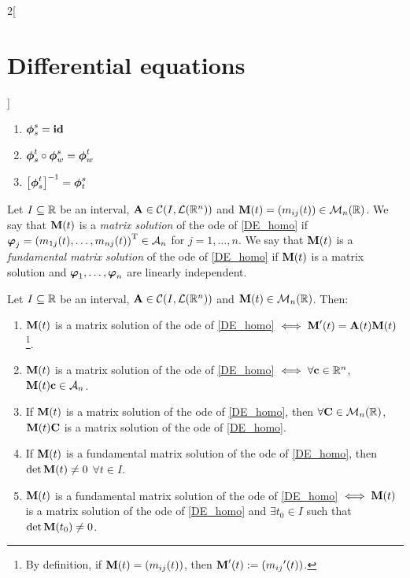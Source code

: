 \documentclass[../../../main.tex]{subfiles}
\begin{document}
\begin{multicols}{2}[\section{Differential equations}]
\begin{corollary}
    \begin{enumerate}
      \item $\boldsymbol{\mathrm{\phi}}_s^s=\boldsymbol{\mathrm{\mathrm{id}}}$
      \item $\boldsymbol{\mathrm{\phi}}_s^t\circ\boldsymbol{\mathrm{\phi}}_w^s=\boldsymbol{\mathrm{\phi}}_w^t$
      \item ${\left[\boldsymbol{\mathrm{\phi}}_s^t\right]}^{-1}=\boldsymbol{\mathrm{\phi}}_t^s$
    \end{enumerate}
  \end{corollary}
  \begin{definition}
    Let $I\subseteq \mathbb{R}$ be an interval, $\boldsymbol{\mathrm{A}}\in\mathcal{C}(I,\mathcal{L}(\mathbb{R}^n))$ and $\boldsymbol{\mathrm{M}}(t)=(m_{ij}(t))\in\mathcal{M}_n(\mathbb{R})$. We say that $\boldsymbol{\mathrm{M}}(t)$ is a \textit{matrix solution} of the ode of \cref{DE_homo} if $\boldsymbol{\mathrm{\varphi}}_j={(m_{1j}(t),\ldots,m_{nj}(t))}^\mathrm{T}\in\mathcal{A}_n$ for $j=1,\ldots,n$. We say that $\boldsymbol{\mathrm{M}}(t)$ is a \textit{fundamental matrix solution} of the ode of \cref{DE_homo} if $\boldsymbol{\mathrm{M}}(t)$ is a matrix solution and $\boldsymbol{\mathrm{\varphi}}_1,\ldots,\boldsymbol{\mathrm{\varphi}}_n$ are linearly independent.
  \end{definition}
  \begin{prop}
    Let $I\subseteq \mathbb{R}$ be an interval, $\boldsymbol{\mathrm{A}}\in\mathcal{C}(I,\mathcal{L}(\mathbb{R}^n))$ and $\boldsymbol{\mathrm{M}}(t)\in\mathcal{M}_n(\mathbb{R})$. Then:
    \begin{enumerate}
      \item $\boldsymbol{\mathrm{M}}(t)$ is a matrix solution of the ode of \cref{DE_homo} $\iff\boldsymbol{\mathrm{M}}'(t)=\boldsymbol{\mathrm{A}}(t)\boldsymbol{\mathrm{M}}(t)$\footnote{By definition, if $\boldsymbol{\mathrm{M}}(t)=(m_{ij}(t))$, then $\boldsymbol{\mathrm{M}}'(t):=({m_{ij}}'(t))$.}.
      \item $\boldsymbol{\mathrm{M}}(t)$ is a matrix solution of the ode of \cref{DE_homo} $\iff\forall \boldsymbol{\mathrm{c}}\in\mathbb{R}^n$, $\boldsymbol{\mathrm{M}}(t)\boldsymbol{\mathrm{c}}\in\mathcal{A}_n$.
      \item If $\boldsymbol{\mathrm{M}}(t)$ is a matrix solution of the ode of \cref{DE_homo}, then $\forall \boldsymbol{\mathrm{C}}\in\mathcal{M}_n(\mathbb{R})$, $\boldsymbol{\mathrm{M}}(t)\boldsymbol{\mathrm{C}}$ is a matrix solution of the ode of \cref{DE_homo}.
      \item If $\boldsymbol{\mathrm{M}}(t)$ is a fundamental matrix solution of the ode of \cref{DE_homo}, then $\det\boldsymbol{\mathrm{M}}(t)\ne 0$ $\forall t\in I$.
      \item $\boldsymbol{\mathrm{M}}(t)$ is a fundamental matrix solution of the ode of \cref{DE_homo} $\iff\boldsymbol{\mathrm{M}}(t)$ is a matrix solution of the ode of \cref{DE_homo} and $\exists t_0\in I$ such that $\det\boldsymbol{\mathrm{M}}(t_0)\ne 0$.

\end{enumerate}
\end{prop}
\end{multicols}
\end{document}

